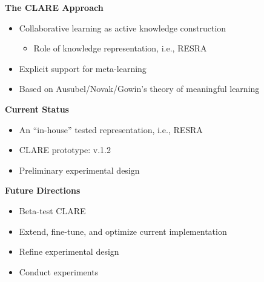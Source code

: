 \begin{slide}   \Huge
  {\bf The CLARE Approach}
  \horizontalline

  \begin{itemize}    
  \item Collaborative learning as active knowledge construction

    \begin{itemize}
    \item Role of knowledge representation, i.e., RESRA
    \end{itemize}

  \item Explicit support for meta-learning
    
  \item Based on Ausubel/Novak/Gowin's theory of meaningful learning

  \end{itemize}
\end{slide}


\begin{slide}   \Huge
  {\bf Current Status}
  \horizontalline
  
  \begin{itemize}
  \item An ``in-house'' tested representation, i.e., RESRA
    
  \item CLARE prototype: v.1.2 
    
  \item Preliminary experimental design
    
  \end{itemize}
\end{slide}



\begin{slide}
  {\bf Future Directions}
  \horizontalline
  
  \begin{itemize}
  \item Beta-test CLARE
    
  \item Extend, fine-tune, and optimize current implementation
    
  \item Refine experimental design 
    
  \item Conduct experiments
  \end{itemize}
\end{slide}











